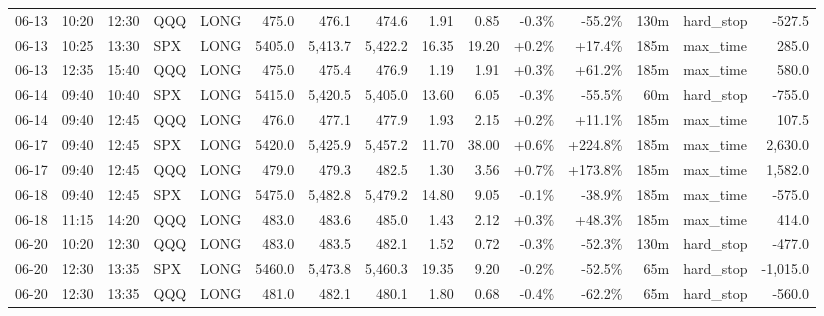 \documentclass[11pt,a4paper,twoside]{article}
\begin{document}
\begin{landscape}
\begin{center}
\begin{longtable}{>{\color{txtmain}}l l l l l r r r r r r r r >{\color{txtmain}}l r}
06-13 & 10:20 & 12:30 & QQQ & LONG & 475.0 & 476.1 & 474.6 & 1.91 & 0.85 & \textcolor{lossred}{-0.3\%} & \textcolor{lossred}{-55.2\%} & 130m & hard\_stop & \textcolor{lossred}{-527.5} \\
06-13 & 10:25 & 13:30 & SPX & LONG & 5405.0 & 5,413.7 & 5,422.2 & 16.35 & 19.20 & \textcolor{wingreen}{+0.2\%} & \textcolor{wingreen}{+17.4\%} & 185m & max\_time & \textcolor{wingreen}{285.0} \\
06-13 & 12:35 & 15:40 & QQQ & LONG & 475.0 & 475.4 & 476.9 & 1.19 & 1.91 & \textcolor{wingreen}{+0.3\%} & \textcolor{wingreen}{+61.2\%} & 185m & max\_time & \textcolor{wingreen}{580.0} \\
06-14 & 09:40 & 10:40 & SPX & LONG & 5415.0 & 5,420.5 & 5,405.0 & 13.60 & 6.05 & \textcolor{lossred}{-0.3\%} & \textcolor{lossred}{-55.5\%} & 60m & hard\_stop & \textcolor{lossred}{-755.0} \\
06-14 & 09:40 & 12:45 & QQQ & LONG & 476.0 & 477.1 & 477.9 & 1.93 & 2.15 & \textcolor{wingreen}{+0.2\%} & \textcolor{wingreen}{+11.1\%} & 185m & max\_time & \textcolor{wingreen}{107.5} \\
06-17 & 09:40 & 12:45 & SPX & LONG & 5420.0 & 5,425.9 & 5,457.2 & 11.70 & 38.00 & \textcolor{wingreen}{+0.6\%} & \textcolor{wingreen}{+224.8\%} & 185m & max\_time & \textcolor{wingreen}{2,630.0} \\
06-17 & 09:40 & 12:45 & QQQ & LONG & 479.0 & 479.3 & 482.5 & 1.30 & 3.56 & \textcolor{wingreen}{+0.7\%} & \textcolor{wingreen}{+173.8\%} & 185m & max\_time & \textcolor{wingreen}{1,582.0} \\
06-18 & 09:40 & 12:45 & SPX & LONG & 5475.0 & 5,482.8 & 5,479.2 & 14.80 & 9.05 & \textcolor{lossred}{-0.1\%} & \textcolor{lossred}{-38.9\%} & 185m & max\_time & \textcolor{lossred}{-575.0} \\
06-18 & 11:15 & 14:20 & QQQ & LONG & 483.0 & 483.6 & 485.0 & 1.43 & 2.12 & \textcolor{wingreen}{+0.3\%} & \textcolor{wingreen}{+48.3\%} & 185m & max\_time & \textcolor{wingreen}{414.0} \\
06-20 & 10:20 & 12:30 & QQQ & LONG & 483.0 & 483.5 & 482.1 & 1.52 & 0.72 & \textcolor{lossred}{-0.3\%} & \textcolor{lossred}{-52.3\%} & 130m & hard\_stop & \textcolor{lossred}{-477.0} \\
06-20 & 12:30 & 13:35 & SPX & LONG & 5460.0 & 5,473.8 & 5,460.3 & 19.35 & 9.20 & \textcolor{lossred}{-0.2\%} & \textcolor{lossred}{-52.5\%} & 65m & hard\_stop & \textcolor{lossred}{-1,015.0} \\
06-20 & 12:30 & 13:35 & QQQ & LONG & 481.0 & 482.1 & 480.1 & 1.80 & 0.68 & \textcolor{lossred}{-0.4\%} & \textcolor{lossred}{-62.2\%} & 65m & hard\_stop & \textcolor{lossred}{-560.0} \\

\end{longtable}
\end{center}
\end{landscape}
\end{document}
